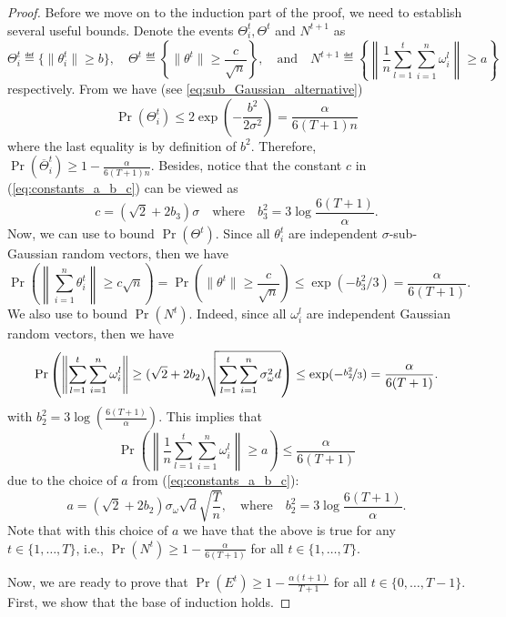 \documentclass[a4paper,11pt]{article}
\begin{document}
\begin{proof}
    Before we move on to the induction part of the proof, we need to establish several useful bounds. Denote the events $\Theta^t_i, \Theta^t$ and $N^{t+1}$ as 
    \begin{equation}
        \Theta^t_i \eqdef \{\|\theta^t_i\| \ge b \}, \quad \Theta^t \eqdef \left\{ \|\theta^t\|\ge \frac{c}{\sqrt{n}} \right\},\quad \text{and} \quad N^{t+1} \eqdef \left\{ \left\|\frac{1}{n}\sum_{l=1}^t\sum_{i=1}^n\omega_i^l\right\| \ge a \right\}
    \end{equation}
    respectively. From  we have (see \eqref{eq:sub_Gaussian_alternative})
    \[\Pr(\Theta^{t}_i) \le 2\exp\left(-\frac{b^2}{2\sigma^2}\right) = \frac{\alpha}{6(T+1)n}\] 
    where the last equality is by definition of $b^2$. Therefore, $\Pr(\overline{\Theta}^t_i) \ge 1 - \frac{\alpha }{6(T+1)n}.$ 
    Besides, notice that the constant $c$ in (\ref{eq:constants_a_b_c}) can be viewed as 
    \[
        c = (\sqrt{2}+2b_3)\sigma \quad\text{where} \quad b_3^2 = 3\log\frac{6(T+1)}{\alpha}.
    \]
    Now, we can use  to bound $\Pr(\Theta^t).$ Since all $\theta^t_i$ are independent $\sigma$-sub-Gaussian random vectors, then we have
    \[
    \Pr\left(\left\|\sum_{i=1}^n\theta^t_i\right\|\ge c\sqrt{n}\right) = \Pr\left(\|\theta^t\| \ge \frac{c}{\sqrt{n}}\right) \le \exp(-b_3^2/3) = \frac{\alpha}{6(T+1)}.
    \]
    We also use  to bound $\Pr(N^t)$. Indeed, since all $\omega_i^l$ are independent Gaussian random vectors, then we have 
    \[\Pr\left(\left\|\sum_{l=1}^t\sum_{i=1}^n\omega_i^l\right\| \ge (\sqrt{2} + 2b_2)\sqrt{\sum_{l=1}^t\sum_{i=1}^n\sigma_{\omega}^2d}\right) \le \exp(-\nicefrac{b_2^2}{3}) = \frac{\alpha}{6(T+1)}.
    \]
    with $b_2^2 = 3\log\left(\frac{6(T+1)}{\alpha}\right).$
    This implies that 
    \[
    \Pr\left(\left\|\frac{1}{n}\sum_{l=1}^t\sum_{i=1}^n\omega_i^l\right\| \ge a\right) \le \frac{\alpha}{6(T+1)}
    \]
    due to the choice of $a$ from (\ref{eq:constants_a_b_c}):
    \[a = (\sqrt{2}+2b_2)\sigma_{\omega}\sqrt{d}\sqrt{\frac{T}{n}}, \quad \text{where} \quad b_2^2 = 3\log\frac{6(T+1)}{\alpha}.
    \]
    Note that with this choice of $a$ we have that the above is true for any $t\in\{1,\ldots, T\}$, i.e., $\Pr(N^t) \ge 1-\frac{\alpha}{6(T+1)}$ for all $t\in\{1,\ldots, T\}.$
    
    Now, we are ready to prove that $\Pr(E^t) \ge 1-\frac{\alpha(t+1)}{T+1}$ for all $t\in\{0,\dots, T-1\}.$ First, we show that the base of induction holds.




\end{proof}
\end{document}
